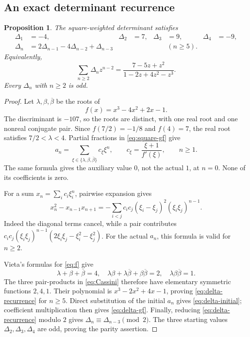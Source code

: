 \documentclass[11pt,letterpaper]{article}
\newtheorem{proposition}[theorem]{Proposition}
\theoremstyle{definition}
\newcommand{\Delt}{\Delta}
\numberwithin{equation}{section}
\begin{document}
\subsection{An exact determinant recurrence}

\begin{proposition}\label{prop:delta-recurrence}
The square-weighted determinant satisfies
\begin{align}
\Delt_1&=-4,&\Delt_2&=7,&\Delt_3&=9,&\Delt_4&=-9,\label{eq:delta-initial}\\
\Delt_n&=2\Delt_{n-1}-4\Delt_{n-2}+\Delt_{n-3}
&&&&(n\ge5).\label{eq:delta-recurrence}
\end{align}
Equivalently,
\begin{equation}\label{eq:delta-gf}
\sum_{n\ge2}\Delt_nz^{n-2}
=\frac{7-5z+z^2}{1-2z+4z^2-z^3}.
\end{equation}
Every $\Delt_n$ with $n\ge2$ is odd.
\end{proposition}

\begin{proof}
Let $\lambda,\beta,\overline\beta$ be the roots of
\begin{equation}\label{eq:f}
f(x)=x^3-4x^2+2x-1.
\end{equation}
The discriminant is $-107$, so the roots are distinct, with one real root
and one nonreal conjugate pair. Since $f(7/2)=-1/8$ and $f(4)=7$,
the real root satisfies $7/2<\lambda<4$.
Partial fractions in \eqref{eq:square-gf} give
\begin{equation}\label{eq:Binet}
a_n=\sum_{\xi\in\{\lambda,\beta,\overline\beta\}}c_\xi\xi^n,
\qquad c_\xi=\frac{\xi+1}{f'(\xi)},\qquad n\ge1.
\end{equation}
The same formula gives the auxiliary value $0$, not the actual $1$, at
$n=0$. None of its coefficients is zero.

For a sum $x_n=\sum_i c_i\xi_i^n$, pairwise expansion gives
\begin{equation}\label{eq:Cassini}
x_n^2-x_{n-1}x_{n+1}
=-\sum_{i<j}c_ic_j(\xi_i-\xi_j)^2(\xi_i\xi_j)^{n-1}.
\end{equation}
Indeed the diagonal terms cancel, while a pair contributes
$c_ic_j(\xi_i\xi_j)^{n-1}(2\xi_i\xi_j-\xi_i^2-\xi_j^2)$.
For the actual $a_n$, this formula is valid for $n\ge2$.

Vieta's formulas for \eqref{eq:f} give
\[
\lambda+\beta+\overline\beta=4,\quad
\lambda\beta+\lambda\overline\beta+\beta\overline\beta=2,\quad
\lambda\beta\overline\beta=1.
\]
The three pair-products in \eqref{eq:Cassini} therefore have elementary
symmetric functions $2,4,1$. Their polynomial is
$x^3-2x^2+4x-1$, proving \eqref{eq:delta-recurrence} for $n\ge5$.
Direct substitution of the initial $a_n$ gives \eqref{eq:delta-initial};
coefficient multiplication then gives \eqref{eq:delta-gf}.
Finally, reducing \eqref{eq:delta-recurrence} modulo $2$ gives
$\Delt_n\equiv\Delt_{n-3}\pmod2$. The three starting values
$\Delt_2,\Delt_3,\Delt_4$ are odd, proving the parity assertion.
\end{proof}
\end{document}
